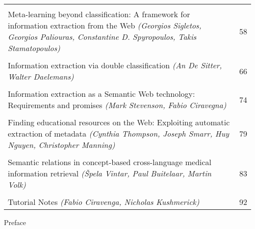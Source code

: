 \documentclass[12pt,a4paper]{article}
\begin{document}
\begin{center}
\begin{tabular}{p{}r}
\mbox{} \\[-8pt]

Meta-learning beyond classification: A framework for information extraction from the Web
\emph{(Georgios Sigletos, Georgios Paliouras, Constantine D. Spyropoulos, Takis Stamatopoulos)}
& 58 \\

\mbox{} \\[-8pt]

Information extraction via double classification
\emph{(An De Sitter, Walter Daelemans)}
& 66 \\

\mbox{} \\[-8pt]

Information extraction as a Semantic Web technology: Requirements and promises
\emph{(Mark Stevenson, Fabio Ciravegna)}
& 74 \\

\mbox{} \\[-8pt]

Finding educational resources on the Web: Exploiting automatic extraction of metadata
\emph{(Cynthia Thompson, Joseph Smarr, Huy Nguyen, Christopher Manning)}
& 79 \\

\mbox{} \\[-8pt]

Semantic relations in concept-based cross-language medical information retrieval
\emph{(\v{S}pela Vintar, Paul Buitelaar, Martin Volk)}
& 83 \\

\mbox{} \\[-8pt]

Tutorial Notes
\emph{(Fabio Ciravenga, Nicholas Kushmerick)}
& 92

\end{tabular}

\end{center}

\newpage

\setcounter{page}{1}
\pagestyle{plain}

\begin{center}
\large Preface
\end{center}

\medskip
\end{document}
